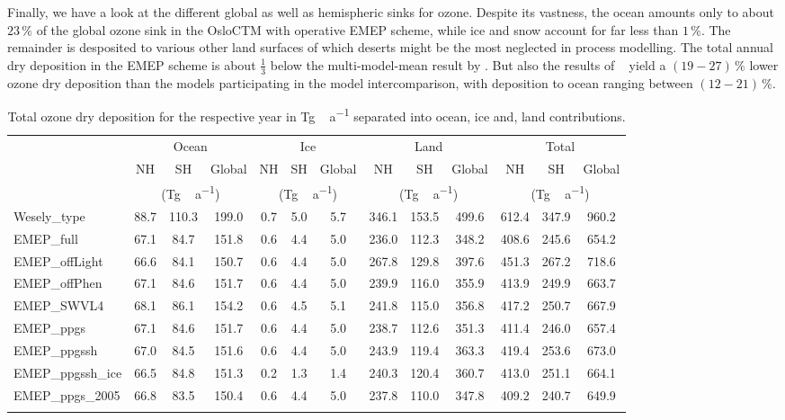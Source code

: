 \documentclass[gmd, manuscript]{copernicus}
\begin{document}
Finally, we have a look at the different global as well as hemispheric sinks for ozone. Despite its vastness, the ocean amounts only to about $23\,\unit{\%}$ of the global ozone sink in the OsloCTM with operative EMEP scheme, while ice and snow account for far less than $1\,\unit{\%}$. The remainder is desposited to various other land surfaces of which deserts might be the most neglected in process modelling. The total annual dry deposition in the EMEP scheme is about $\frac{1}{3}$ below the multi-model-mean result by \citet{ACP:Hardacre2015}. But also the results of ~\citet{ACP:Luhar2017} yield a $(19-27)\,\unit{\%}$ lower ozone dry deposition than the models participating in the model intercomparison, with deposition to ocean ranging between $(12-21)\,\unit{\%}$.
%
\begin{table*}[t]
\caption{Total ozone dry deposition for the respective year in \unit{Tg\,a^{-1}} separated into ocean, ice and, land contributions.}
\begin{tabular}{lcccccccccccc}
\tophline
\multirow{3}{*}{Simulation} & \multicolumn{3}{c}{Ocean} & \multicolumn{3}{c}{Ice} & \multicolumn{3}{c}{Land} & \multicolumn{3}{c}{Total}\\
& NH & SH & Global & NH & SH & Global & NH & SH & Global & NH & SH & Global\\
& \multicolumn{3}{c}{(\unit{Tg\,a^{-1}})} & \multicolumn{3}{c}{(\unit{Tg\,a^{-1}})} & \multicolumn{3}{c}{(\unit{Tg\,a^{-1}})} & \multicolumn{3}{c}{(\unit{Tg\,a^{-1}})}\\
\middlehline
Wesely\_type & 88.7 & 110.3 & 199.0 & 0.7 & 5.0 & 5.7 & 346.1 & 153.5 & 499.6 & 612.4 & 347.9 & 960.2 \\
EMEP\_full & 67.1 & 84.7 & 151.8 & 0.6 & 4.4 & 5.0 & 236.0 & 112.3 & 348.2 & 408.6 & 245.6 & 654.2 \\
EMEP\_offLight & 66.6 & 84.1 & 150.7 & 0.6 & 4.4 & 5.0 & 267.8 & 129.8 & 397.6 & 451.3 & 267.2 & 718.6 \\
EMEP\_offPhen & 67.1 & 84.6 & 151.7 & 0.6 & 4.4 & 5.0 & 239.9 & 116.0 & 355.9 & 413.9 & 249.9 & 663.7 \\
EMEP\_SWVL4 & 68.1 & 86.1 & 154.2 & 0.6 & 4.5 & 5.1 & 241.8 & 115.0 & 356.8 & 417.2 & 250.7 & 667.9 \\
EMEP\_ppgs & 67.1 & 84.6 & 151.7 & 0.6 & 4.4 & 5.0 & 238.7 & 112.6 & 351.3 & 411.4 & 246.0 & 657.4 \\
EMEP\_ppgssh & 67.0 & 84.5 & 151.6 & 0.6 & 4.4 & 5.0 & 243.9 & 119.4 & 363.3 & 419.4 & 253.6 & 673.0 \\
EMEP\_ppgssh\_ice & 66.5 & 84.8 & 151.3 & 0.2 & 1.3 & 1.4 & 240.3 & 120.4 & 360.7 & 413.0 & 251.1 & 664.1 \\
EMEP\_ppgs\_2005 & 66.8 & 83.5 & 150.4 & 0.6 & 4.4 & 5.0 & 237.8 & 110.0 & 347.8 & 409.2 & 240.7 & 649.9 \\
\bottomhline
\end{tabular}
\end{table*}
%
\end{document}
